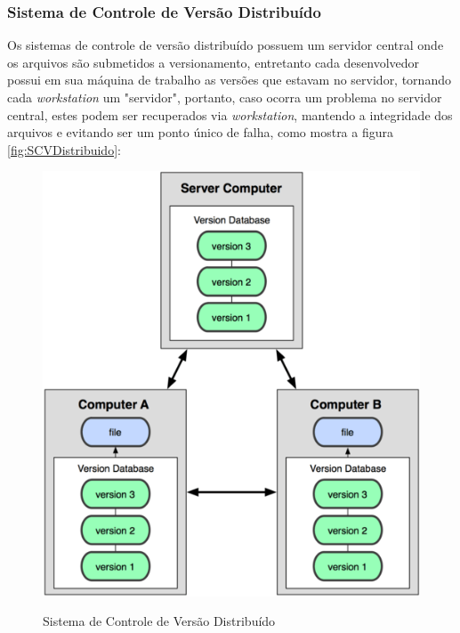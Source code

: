 \subsubsection{Sistema de Controle de Versão Distribuído}Os sistemas de controle de versão distribuído possuem um servidor central onde os arquivos são submetidos a versionamento, entretanto cada desenvolvedor possui em sua máquina de trabalho as versões que estavam no servidor, tornando cada \textit{workstation} um "servidor", portanto, caso ocorra um problema no servidor central, estes podem ser recuperados via \textit{workstation}, mantendo a integridade dos arquivos e evitando ser um ponto único de falha, como mostra a figura \autoref{fig:SCVDistribuido}:
\begin{figure}[tbh]
\centering
\caption[Sistema de Controle de Versão Distribuído]{Sistema de Controle de Versão Distribuído}
\includegraphics[width=0.5\linewidth]{./images/scvdist}
\label{fig:SCVDistribuido}
\end{figure}
